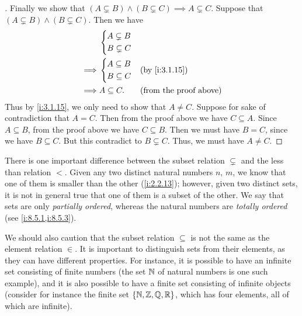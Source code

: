 \begin{proof}[]
  Finally we show that \((A \subsetneq B) \land (B \subsetneq C) \implies A \subsetneq C\).
  Suppose that  \((A \subsetneq B) \land (B \subsetneq C)\).
  Then we have
  \begin{align*}
             & \begin{dcases}
                 A \subsetneq B \\
                 B \subsetneq C
               \end{dcases}                                       \\
    \implies & \begin{dcases}
                 A \subseteq B \\
                 B \subseteq C
               \end{dcases}  &  & \by{i:3.1.15}                     \\
    \implies & A \subseteq C.    &  & \text{(from the proof above)}
  \end{align*}
  Thus by \cref{i:3.1.15}, we only need to show that \(A \neq C\).
  Suppose for sake of contradiction that \(A = C\).
  Then from the proof above we have \(C \subseteq A\).
  Since \(A \subseteq B\), from the proof above we have \(C \subseteq B\).
  Then we must have \(B = C\), since we have \(B \subseteq C\).
  But this contradict to \(B \subsetneq C\).
  Thus, we must have \(A \neq C\).
\end{proof}

\setcounter{thm}{19}
\begin{rmk}\label{i:3.1.20}
  There is one important difference between the subset relation \(\subsetneq\) and the less than relation \(<\).
  Given any two distinct natural numbers \(n\), \(m\), we know that one of them is smaller than the other (\cref{i:2.2.13});
  however, given two distinct sets, it is not in general true that one of them is a subset of the other.
  We say that sets are only \emph{partially ordered}, whereas the natural numbers are \emph{totally ordered} (see \cref{i:8.5.1,i:8.5.3}).
\end{rmk}

\begin{rmk}\label{i:3.1.21}
  We should also caution that the subset relation \(\subseteq\) is not the same as the element relation \(\in\).
  It is important to distinguish sets from their elements, as they can have different properties.
  For instance, it is possible to have an infinite set consisting of finite numbers (the set \(\mathbb{N}\) of natural numbers is one such example), and it is also possible to have a finite set consisting of infinite objects
  (consider for instance the finite set \(\left\lbrace\mathbb{N}, \mathbb{Z}, \mathbb{Q}, \mathbb{R}\right\rbrace\), which has four elements, all of which are infinite).
\end{rmk}

